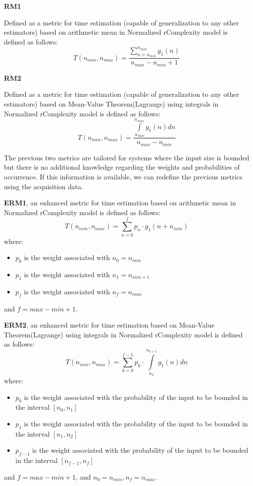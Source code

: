 \begin{definition}
    \textbf{RM1}

    Defined as a metric for time estimation (capable of generalization to any other estimators) based on arithmetic mean in Normalized rComplexity model is defined as follows:
    \[  T(n_{min}, n_{max}) = \dfrac{\sum\limits_{n=n_{min}}^{n_{max}} g_{1}(n)}{n_{max} - n_{min} + 1}  \]
\end{definition}

\begin{definition}
    \textbf{RM2}

    Defined as a metric for time estimation (capable of generalization to any other estimators) based on Mean-Value Theorem(Lagrange) using integrals in Normalized rComplexity model is defined as follows:
    \[  T(n_{min}, n_{max}) = \dfrac{\int\limits_{n_{min}}^{n_{max}} g_{1}(n) dn}{n_{max} - n_{min}}  \]
\end{definition}

The previous two metrics are tailored for systems where the input size is bounded but there is no additional knowledge regarding the weights and probabilities of occurrence. If this information is available, we can redefine the previous metrics using the acquisition data.

\begin{definition}
    \textbf{ERM1}, an enhanced metric for time estimation based on arithmetic mean in Normalized rComplexity model is defined as follows:
    \[  T(n_{min}, n_{max}) = \sum\limits_{n=0}^{f} p_{n} \cdot g_{1}(n + n_{min})  \]
    where:
    \begin{itemize}
        \item $p_{0}$ is the weight associated with $n_{0} = n_{min}$
        \item $p_{1}$ is the weight associated with $n_{1} = n_{min + 1}$
        \item $p_{f}$ is the weight associated with $n_{f} = n_{max}$
    \end{itemize}
    and $f = max - min + 1$.
\end{definition}

\begin{definition}
    \textbf{ERM2}, an enhanced metric for time estimation based on Mean-Value Theorem(Lagrange) using integrals in Normalized rComplexity model is defined as follows:
    \[  T(n_{min}, n_{max}) =\sum\limits_{k=0}^{f-1} p_{k} \cdot \int\limits_{n_{k}}^{n_{k+1}} g_{1}(n) dn  \]
    where:
    \begin{itemize}
        \item $p_{0}$ is the weight associated with the probability of the input to be bounded in the interval $[n_{0}, n_{1}]$
        \item $p_{1}$ is the weight associated with the probability of the input to be bounded in the interval $[n_{1}, n_{2}]$
        \item $p_{f-1}$ is the weight associated with the probability of the input to be bounded in the interval $[n_{f-1}, n_{f}]$
    \end{itemize}
    and $f = max - min + 1$, and $n_{0} = n_{min}, n_{f} = n_{max}$.
\end{definition}


